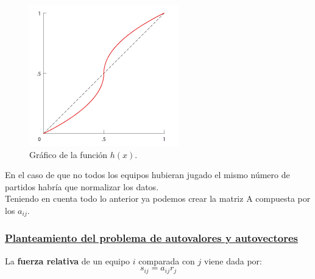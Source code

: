 	\begin{figure}[htb]
		\centering
		\includegraphics{images/funcion_keener.png}
		\caption{Gráfico de la función $h(x)$.} \label{fig:func_skew}
	\end{figure}

En el caso de que no todos los equipos hubieran jugado el mismo número de partidos habría que normalizar los datos.\\

Teniendo en cuenta todo lo anterior ya podemos crear la matriz A compuesta por los $a_{ij}$.

\subsubsection*{\underline{Planteamiento del problema de autovalores y autovectores}}
\begin{defi} 
	La \textbf{fuerza relativa} de un equipo $i$ comparada con $j$ viene dada por: 
	\begin{equation}
		s_{ij} = a_{ij}r_{j}
	\end{equation}
\end{defi}


